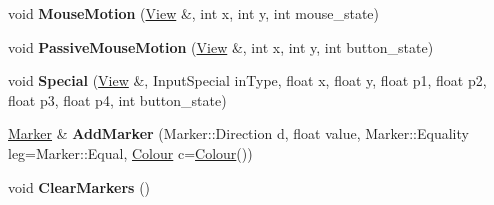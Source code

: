 \begin{DoxyCompactItemize}
\item 
void {\bfseries Mouse\+Motion} (\hyperlink{structpangolin_1_1_view}{View} \&, int x, int y, int mouse\+\_\+state)\hypertarget{classpangolin_1_1_plotter_a761b5286086df7b7569ce96fce59ba8d}{}\label{classpangolin_1_1_plotter_a761b5286086df7b7569ce96fce59ba8d}

\item 
void {\bfseries Passive\+Mouse\+Motion} (\hyperlink{structpangolin_1_1_view}{View} \&, int x, int y, int button\+\_\+state)\hypertarget{classpangolin_1_1_plotter_a11b97c61cdf697734b8082f18ab8cd01}{}\label{classpangolin_1_1_plotter_a11b97c61cdf697734b8082f18ab8cd01}

\item 
void {\bfseries Special} (\hyperlink{structpangolin_1_1_view}{View} \&, Input\+Special in\+Type, float x, float y, float p1, float p2, float p3, float p4, int button\+\_\+state)\hypertarget{classpangolin_1_1_plotter_aac79230630e398c8d11552ce19f65583}{}\label{classpangolin_1_1_plotter_aac79230630e398c8d11552ce19f65583}

\item 
\hyperlink{structpangolin_1_1_marker}{Marker} \& {\bfseries Add\+Marker} (Marker\+::\+Direction d, float value, Marker\+::\+Equality leg=Marker\+::\+Equal, \hyperlink{structpangolin_1_1_colour}{Colour} c=\hyperlink{structpangolin_1_1_colour}{Colour}())\hypertarget{classpangolin_1_1_plotter_abd7620a9a12699e3cbc697d9483e1679}{}\label{classpangolin_1_1_plotter_abd7620a9a12699e3cbc697d9483e1679}

\item 
void {\bfseries Clear\+Markers} ()\hypertarget{classpangolin_1_1_plotter_a8962e7067de746c92ab66c5bb08dd650}{}\label{classpangolin_1_1_plotter_a8962e7067de746c92ab66c5bb08dd650}

\end{DoxyCompactItemize}
